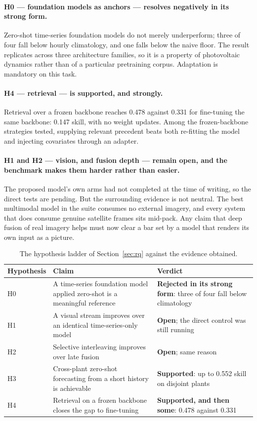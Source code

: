 \paragraph{H0 --- foundation models as anchors --- resolves negatively in its strong form.}
Zero-shot time-series foundation models do not merely underperform; three of four fall below
hourly climatology, and one falls below the naive floor. The result replicates across three
architecture families, so it is a property of photovoltaic dynamics rather than of a
particular pretraining corpus. Adaptation is mandatory on this task.

\paragraph{H4 --- retrieval --- is supported, and strongly.} Retrieval over a frozen backbone
reaches 0.478 against 0.331 for fine-tuning the same backbone: 0.147 skill, with no weight
updates. Among the frozen-backbone strategies tested, supplying relevant precedent beats both
re-fitting the model and injecting covariates through an adapter.

\paragraph{H1 and H2 --- vision, and fusion depth --- remain open, and the benchmark makes
them harder rather than easier.} The proposed model's own arms had not completed at the time
of writing, so the direct tests are pending. But the surrounding evidence is not neutral. The
best multimodal model in the suite consumes no external imagery, and every system that does
consume genuine satellite frames sits mid-pack. Any claim that deep fusion of real imagery
helps must now clear a bar set by a model that renders its own input as a picture.

\begin{table}[h!]
\centering
\small
\begin{tabular}{l p{6.6cm} p{4.6cm}}
\hline
\textbf{Hypothesis} & \textbf{Claim} & \textbf{Verdict} \\
\hline
H0 & A time-series foundation model applied zero-shot is a meaningful reference &
\textbf{Rejected in its strong form}: three of four fall below climatology \\
H1 & A visual stream improves over an identical time-series-only model & \textbf{Open};
the direct control was still running \\
H2 & Selective interleaving improves over late fusion & \textbf{Open}; same reason \\
H3 & Cross-plant zero-shot forecasting from a short history is achievable &
\textbf{Supported}: up to 0.552 skill on disjoint plants \\
H4 & Retrieval on a frozen backbone closes the gap to fine-tuning & \textbf{Supported, and
then some}: 0.478 against 0.331 \\
\hline
\end{tabular}
\caption{The hypothesis ladder of Section~\ref{sec:rq} against the evidence obtained.}
\label{tab:verdicts}
\end{table}

